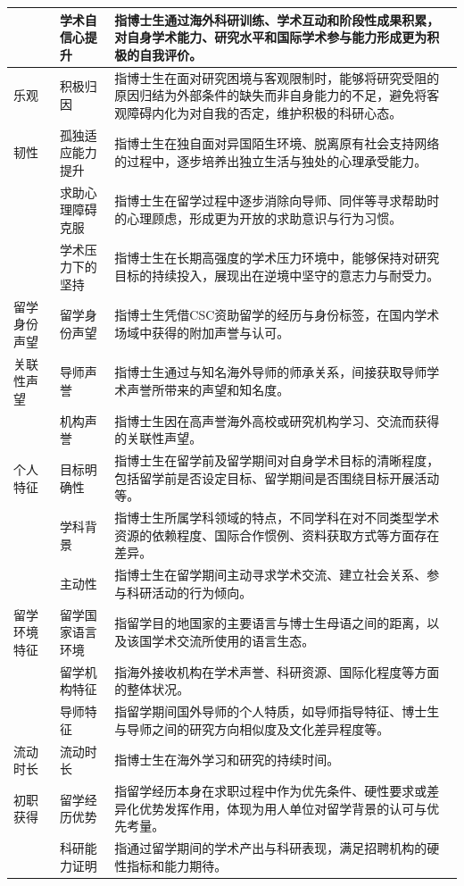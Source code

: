 {\begin{longtable}{p{2.5cm}p{3cm}p{9cm}}
 & 学术自信心提升 & 指博士生通过海外科研训练、学术互动和阶段性成果积累，对自身学术能力、研究水平和国际学术参与能力形成更为积极的自我评价。 \\
\midrule
乐观 & 积极归因 & 指博士生在面对研究困境与客观限制时，能够将研究受阻的原因归结为外部条件的缺失而非自身能力的不足，避免将客观障碍内化为对自我的否定，维护积极的科研心态。 \\
\midrule
韧性 & 孤独适应能力提升 & 指博士生在独自面对异国陌生环境、脱离原有社会支持网络的过程中，逐步培养出独立生活与独处的心理承受能力。 \\
 & 求助心理障碍克服 & 指博士生在留学过程中逐步消除向导师、同伴等寻求帮助时的心理顾虑，形成更为开放的求助意识与行为习惯。 \\
 & 学术压力下的坚持 & 指博士生在长期高强度的学术压力环境中，能够保持对研究目标的持续投入，展现出在逆境中坚守的意志力与耐受力。 \\
\midrule
留学身份声望 & 留学身份声望 & 指博士生凭借CSC资助留学的经历与身份标签，在国内学术场域中获得的附加声誉与认可。 \\
\midrule
关联性声望 & 导师声誉 & 指博士生通过与知名海外导师的师承关系，间接获取导师学术声誉所带来的声望和知名度。 \\
 & 机构声誉 & 指博士生因在高声誉海外高校或研究机构学习、交流而获得的关联性声望。 \\
\midrule
个人特征 & 目标明确性 & 指博士生在留学前及留学期间对自身学术目标的清晰程度，包括留学前是否设定目标、留学期间是否围绕目标开展活动等。 \\
 & 学科背景 & 指博士生所属学科领域的特点，不同学科在对不同类型学术资源的依赖程度、国际合作惯例、资料获取方式等方面存在差异。 \\
 & 主动性 & 指博士生在留学期间主动寻求学术交流、建立社会关系、参与科研活动的行为倾向。 \\
\midrule
留学环境特征 & 留学国家语言环境 & 指留学目的地国家的主要语言与博士生母语之间的距离，以及该国学术交流所使用的语言生态。 \\
 & 留学机构特征 & 指海外接收机构在学术声誉、科研资源、国际化程度等方面的整体状况。 \\
 & 导师特征 & 指留学期间国外导师的个人特质，如导师指导特征、博士生与导师之间的研究方向相似度及文化差异程度等。 \\
\midrule
流动时长 & 流动时长 & 指博士生在海外学习和研究的持续时间。 \\
\midrule
初职获得 & 留学经历优势 & 指留学经历本身在求职过程中作为优先条件、硬性要求或差异化优势发挥作用，体现为用人单位对留学背景的认可与优先考量。 \\
 & 科研能力证明 & 指通过留学期间的学术产出与科研表现，满足招聘机构的硬性指标和能力期待。 \\

\end{longtable}}
